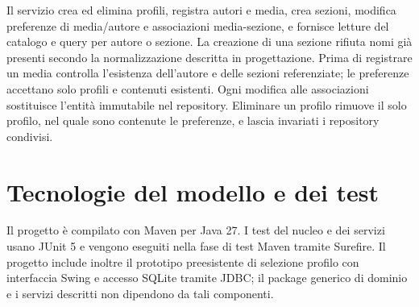 Il servizio crea ed elimina profili, registra autori e media, crea sezioni, modifica preferenze di media/autore e associazioni media-sezione, e fornisce letture del catalogo e query per autore o sezione. La creazione di una sezione rifiuta nomi già presenti secondo la normalizzazione descritta in progettazione. Prima di registrare un media controlla l'esistenza dell'autore e delle sezioni referenziate; le preferenze accettano solo profili e contenuti esistenti. Ogni modifica alle associazioni sostituisce l'entità immutabile nel repository. Eliminare un profilo rimuove il solo profilo, nel quale sono contenute le preferenze, e lascia invariati i repository condivisi.

\section{Tecnologie del modello e dei test}
Il progetto è compilato con Maven per Java 27. I test del nucleo e dei servizi usano JUnit 5 e vengono eseguiti nella fase di test Maven tramite Surefire. Il progetto include inoltre il prototipo preesistente di selezione profilo con interfaccia Swing e accesso SQLite tramite JDBC; il package generico di dominio e i servizi descritti non dipendono da tali componenti.
